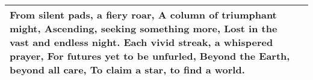 \begin{table*}[h!]
{\begin{tabular}{p{} p{}}
\newline
From silent pads, a fiery roar, \newline
A column of triumphant might, \newline
Ascending, seeking \textbf{something more}, \newline
Lost in the vast and endless night. \newline
\newline
Each vivid streak, a \textbf{whispered prayer}, \newline
For \textbf{futures yet to be unfurled}, \newline
Beyond the Earth, beyond all care, \newline
To \textbf{claim a star, to find a world}. \\
\bottomrule
\end{tabular}
}
\end{table*}


